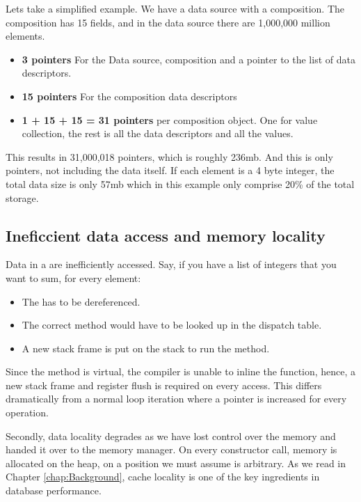 Lets take a simplified example. We have a data source with a composition. The composition has 15 fields, and in the data source there are 1,000,000 million elements.
\begin{itemize}
    \item \textbf{3 pointers} For the Data source, composition and a pointer to the list of data descriptors.
    \item \textbf{15 pointers} For the composition data descriptors
    \item \textbf{1 + 15 + 15 = 31 pointers} per composition object. One for value collection, the rest is all the data descriptors and all the values.
\end{itemize}

This results in 31,000,018 pointers, which is roughly 236mb. And this is only pointers, not including the data itself. If each element is a 4 byte integer, the total data size is only 57mb which in this example only comprise 20\% of the total storage.

\subsection{Ineficcient data access and memory locality}
\label{sub:Ineficcient data access and memory locality}
Data in a  are inefficiently accessed. Say, if you have a list of  integers that you want to sum, for every element:
\begin{itemize}
    \item The  has to be dereferenced.
    \item The correct  method would have to be looked up in the dispatch table.
    \item A new stack frame is put on the stack to run the  method.
\end{itemize}
Since the method is virtual, the compiler is unable to inline the function, hence, a new stack frame and register flush is required on every access. This differs dramatically from a normal loop iteration where a pointer is increased for every operation.

Secondly, data locality degrades as we have lost control over the memory and handed it over to the memory manager. On every constructor call, memory is allocated on the heap, on a position we must assume is arbitrary. As we read in Chapter \ref{chap:Background}, cache locality is one of the key ingredients in database performance.


